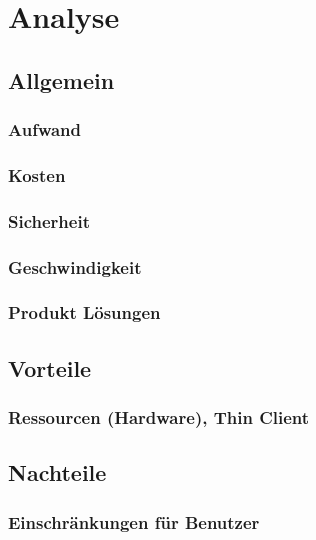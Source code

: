 

\chapter{Analyse}

\section{Allgemein}

\subsection{Aufwand}

\subsection{Kosten}

\subsection{Sicherheit}

\subsection{Geschwindigkeit}

\subsection{Produkt Lösungen }



\section{Vorteile}

\subsection{Ressourcen (Hardware), Thin Client}


\section{Nachteile}

\subsection{Einschränkungen für Benutzer}
